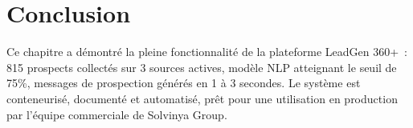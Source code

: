 \section{Conclusion}

Ce chapitre a démontré la pleine fonctionnalité de la plateforme LeadGen 360+~:
815 prospects collectés sur 3 sources actives, modèle NLP atteignant le seuil de
75\%, messages de prospection générés en 1 à 3 secondes. Le système est
conteneurisé, documenté et automatisé, prêt pour une utilisation en production
par l'équipe commerciale de Solvinya Group.
